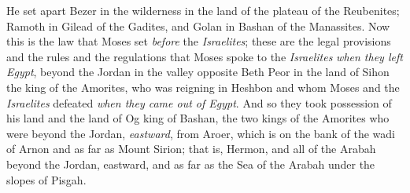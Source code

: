 \begin{biblechapter}
\verse He set apart Bezer in the wilderness in the land of the plateau of the Reubenites; Ramoth in Gilead of the Gadites, and Golan in Bashan of the Manassites.
\verse Now this is the law that Moses set \textit{before} the \textit{Israelites};
\verse these are the legal provisions and the rules and the regulations that Moses spoke to the \textit{Israelites} \textit{when they left Egypt},
\verse beyond the Jordan in the valley opposite Beth Peor in the land of Sihon the king of the Amorites, who was reigning in Heshbon and whom Moses and the \textit{Israelites} defeated \textit{when they came out of Egypt}.
\verse And so they took possession of his land and the land of Og king of Bashan, the two kings of the Amorites who were beyond the Jordan, \textit{eastward},
\verse from Aroer, which is on the bank of the wadi of Arnon and as far as Mount Sirion; that is, Hermon,
\verse and all of the Arabah beyond the Jordan, eastward, and as far as the Sea of the Arabah under the slopes of Pisgah.
\end{biblechapter}

